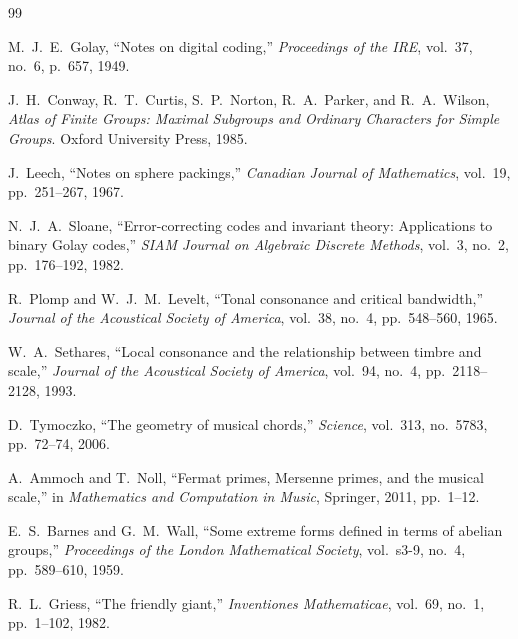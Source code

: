 \documentclass[11pt,a4paper]{article}
\theoremstyle{definition}
\begin{document}
\begin{thebibliography}{99}

M.~J.~E.~Golay,
``Notes on digital coding,''
\textit{Proceedings of the IRE}, vol.~37, no.~6, p.~657, 1949.

J.~H.~Conway, R.~T.~Curtis, S.~P.~Norton, R.~A.~Parker, and R.~A.~Wilson,
\textit{Atlas of Finite Groups: Maximal Subgroups and Ordinary Characters for Simple Groups}.
Oxford University Press, 1985.

J.~Leech,
``Notes on sphere packings,''
\textit{Canadian Journal of Mathematics}, vol.~19, pp.~251--267, 1967.

N.~J.~A.~Sloane,
``Error-correcting codes and invariant theory: Applications to binary Golay codes,''
\textit{SIAM Journal on Algebraic Discrete Methods}, vol.~3, no.~2, pp.~176--192, 1982.

R.~Plomp and W.~J.~M.~Levelt,
``Tonal consonance and critical bandwidth,''
\textit{Journal of the Acoustical Society of America}, vol.~38, no.~4, pp.~548--560, 1965.

W.~A.~Sethares,
``Local consonance and the relationship between timbre and scale,''
\textit{Journal of the Acoustical Society of America}, vol.~94, no.~4, pp.~2118--2128, 1993.

D.~Tymoczko,
``The geometry of musical chords,''
\textit{Science}, vol.~313, no.~5783, pp.~72--74, 2006.

A.~Ammoch and T.~Noll,
``Fermat primes, Mersenne primes, and the musical scale,''
in \textit{Mathematics and Computation in Music}, Springer, 2011, pp.~1--12.

E.~S.~Barnes and G.~M.~Wall,
``Some extreme forms defined in terms of abelian groups,''
\textit{Proceedings of the London Mathematical Society}, vol.~s3-9, no.~4, pp.~589--610, 1959.

R.~L.~Griess,
``The friendly giant,''
\textit{Inventiones Mathematicae}, vol.~69, no.~1, pp.~1--102, 1982.

\end{thebibliography}
\end{document}

